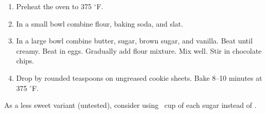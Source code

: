 
\begin{ingredients}
\end{ingredients}


\begin{recipe}
  \begin{enumerate}

  \item Preheat the oven to 375 $^\circ$F.

  \item In a small bowl combine flour, baking soda, and slat.

  \item In a large bowl combine butter, sugar, brown sugar, and
    vanilla.  Beat until creamy.  Beat in eggs.  Gradually add flour
    mixture.  Mix well.  Stir in chocolate chips.
    
  \item Drop by rounded teaspoons on ungreased cookie sheets.  Bake
    8--10 minutes at 375 $^\circ$F.

  \end{enumerate}
\end{recipe}

As a less sweet variant (untested), consider using \fracH\ cup of each
sugar instead of \fracQQ.
